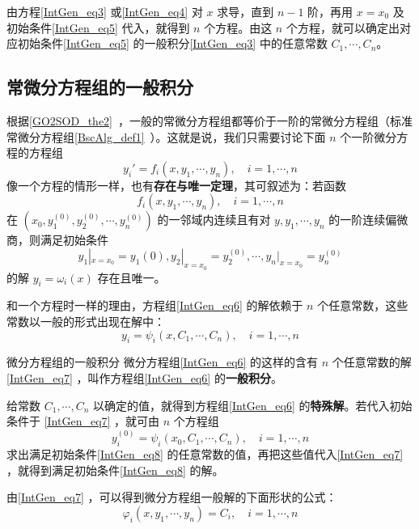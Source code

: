 由方程\autoref{IntGen_eq3} 或\autoref{IntGen_eq4} 对 $x$ 求导，直到 $n-1$ 阶，再用 $x=x_0$ 及初始条件\autoref{IntGen_eq5} 代入，就得到 $n$ 个方程。由这 $n$ 个方程，就可以确定出对应初始条件\autoref{IntGen_eq5} 的一般积分\autoref{IntGen_eq3} 中的任意常数 $C_1,\cdots,C_n$。
\subsection{常微分方程组的一般积分}
根据\autoref{GO2SOD_the2}~，一般的常微分方程组都等价于一阶的常微分方程组（标准常微分方程组\autoref{BscAlg_def1}~）。这就是说，我们只需要讨论下面 $n$ 个一阶微分方程的方程组
\begin{equation}\label{IntGen_eq6}
y_i'=f_i(x,y_1,\cdots,y_n),\quad i=1,\cdots,n
\end{equation}
像一个方程的情形一样，也有\textbf{存在与唯一定理}，其可叙述为：若函数
\begin{equation}
f_i(x,y_1,\cdots,y_n),\quad i=1,\cdots,n
\end{equation}
在 $(x_0,y_1^{(0)},y_2^{(0)},\cdots,y_n^{(0)})$ 的一邻域内连续且有对 $y,y_1,\cdots,y_n$ 的一阶连续偏微商，则满足初始条件
\begin{equation}\label{IntGen_eq8}
y_1|_{x=x_0}=y_1{(0)},y_2|_{x=x_0}=y_2^{(0)},\cdots,y_n|_{x=x_0}=y_n^{(0)}
\end{equation}
的解 $y_i=\omega_i(x)$ 存在且唯一。

和一个方程时一样的理由，方程组\autoref{IntGen_eq6} 的解依赖于 $n$ 个任意常数，这些常数以一般的形式出现在解中：
\begin{equation}\label{IntGen_eq7}
y_i=\psi_i(x,C_1,\cdots,C_n),\quad i=1,\cdots,n
\end{equation}
\begin{definition}{微分方程组的一般积分}
微分方程组\autoref{IntGen_eq6} 的这样的含有 $n$ 个任意常数的解\autoref{IntGen_eq7} ，叫作方程组\autoref{IntGen_eq6} 的\textbf{一般积分}。
\end{definition}
给常数 $C_1,\cdots,C_n$ 以确定的值，就得到方程组\autoref{IntGen_eq6} 的\textbf{特殊解}。若代入初始条件于 \autoref{IntGen_eq7} ，就可由 $n$ 个方程组
\begin{equation}
y_i^{(0)}=\psi_i(x_0,C_1,\cdots,C_n),\quad i=1,\cdots,n
\end{equation}
求出满足初始条件\autoref{IntGen_eq8} 的任意常数的值，再把这些值代入\autoref{IntGen_eq7} ，就得到满足初始条件\autoref{IntGen_eq8} 的解。

由\autoref{IntGen_eq7} ，可以得到微分方程组一般解的下面形状的公式：
\begin{equation}
\varphi_i(x,y_1,\cdots,y_n)=C_i,\quad i=1,\cdots,n
\end{equation}
